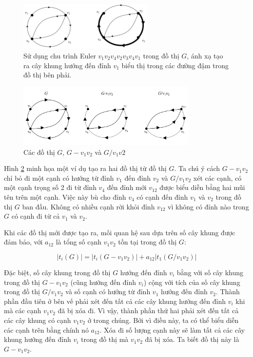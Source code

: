 \documentclass[14pt, a4paper]{article}
\numberwithin{equation}{section}
\numberwithin{figure}{section}
\numberwithin{dl}{section}
\numberwithin{md}{section}
\numberwithin{bd}{section}
\numberwithin{dn}{section}
\numberwithin{hq}{section}
\begin{document}
    \begin{figure}[h!]
        \centering
        \includegraphics[width=0.6\textwidth]{4.png}
        \caption{Sử dụng chu trình Euler $v_1 v_2 v_4 v_2 v_3 v_4 v_1$ trong đồ thị $G$, ánh xạ tạo ra cây khung hướng đến đỉnh $v_1$ biểu thị trong các đường đậm trong đồ thị bên phải.}
        \label{fig:4}
    \end{figure}

    \begin{figure}[h!]
        \centering
        \includegraphics[width=0.8\textwidth]{5.png}
        \caption{Các đồ thị $G$, $G - v_1 v_2$ và $G / v_1 v2$}
        \label{fig:5}
    \end{figure}

    Hình \ref{fig:5} minh họa một ví dụ tạo ra hai đồ thị từ đồ thị $G$.
    Ta chú ý cách $G - v_1 v_2$ chỉ bỏ đi một cạnh có hướng từ đỉnh $v_1$ đến đỉnh $v_2$ và $G / v_1 v_2$ xét các cạnh, có một cạnh trọng số 2 đi từ đỉnh $v_4$ đến đỉnh mới $v_{12}$ được biểu diễn bằng hai mũi tên trên một cạnh.
    Việc này bù cho đỉnh $v_4$ có cạnh đến đỉnh $v_1$ và $v_2$ trong đồ thị $G$ ban đầu.
    Không có nhiều cạnh rời khỏi đỉnh $v_{12}$ vì không có đỉnh nào trong $G$ có cạnh đi từ cả $v_1$ và $v_2$.

    Khi các đồ thị mới được tạo ra, mối quan hệ sau dựa trên số cây khung được đảm bảo, với $a_{12}$ là tổng số cạnh $v_1 v_2$ tồn tại trong đồ thị $G$:

    \begin{equation}
        \lvert t_i (G) \rvert = \lvert t_i (G - v_1 v_2) \rvert + a_{12} \lvert t_1 (G / v_1 v_2) \rvert
    \end{equation}

    Đặc biệt, số cây khung trong đồ thị $G$ hướng đến đỉnh $v_i$ bằng với số cây khung trong đồ thị $G - v_1 v_2$ (cũng hướng đến đỉnh $v_i$) cộng với tích của số cây khung trong đồ thị $G / v_1 v_2$ và số cạnh có hướng từ đỉnh $v_1$ hướng đến đỉnh $v_2$.
    Thành phần đầu tiên ở bên vế phải xét đến tất cả các cây khung hướng đến đỉnh $v_i$ khi mà các cạnh $v_1 v_2$ đã bị xóa đi.
    Vì vậy, thành phần thứ hai phải xét đến tất cả các cây khung có cạnh $v_1 v_2$ ở trong chúng.
    Bởi vì điều này, ta có thể biểu diễn các cạnh trên bằng chính nó $a_{12}$.
    Xóa đi số lượng cạnh này sẽ làm tất cả các cây khung hướng đến đỉnh $v_i$ trong đồ thị mà $v_1 v_2$ đã bị xóa. Ta biết đồ thị này là $G - v_1 v_2$.
\end{document}
